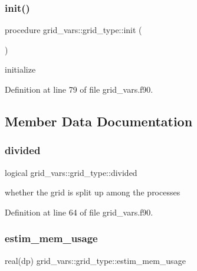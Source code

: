\subsubsection{\texorpdfstring{init()}{init()}}
{\footnotesize\ttfamily procedure grid\+\_\+vars\+::grid\+\_\+type\+::init (\begin{DoxyParamCaption}{ }\end{DoxyParamCaption})}



initialize 



Definition at line 79 of file grid\+\_\+vars.\+f90.



\subsection{Member Data Documentation}
\mbox{\label{structgrid__vars_1_1grid__type_ac4e6680c60d5a7ef4b776e5df5410f8a}} 
\subsubsection{\texorpdfstring{divided}{divided}}
{\footnotesize\ttfamily logical grid\+\_\+vars\+::grid\+\_\+type\+::divided}



whether the grid is split up among the processes 



Definition at line 64 of file grid\+\_\+vars.\+f90.

\mbox{\label{structgrid__vars_1_1grid__type_a18ae7f2f277c6aea8402fdc81a7d58f6}} 
\subsubsection{\texorpdfstring{estim\+\_\+mem\+\_\+usage}{estim\_mem\_usage}}
{\footnotesize\ttfamily real(dp) grid\+\_\+vars\+::grid\+\_\+type\+::estim\+\_\+mem\+\_\+usage}



